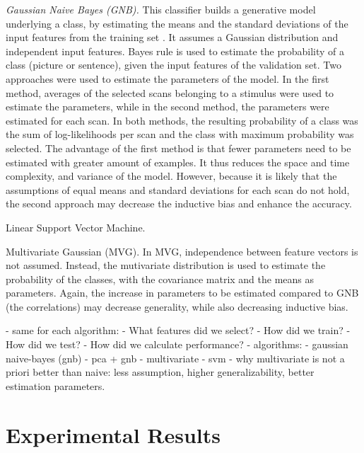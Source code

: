 \documentclass[preprint,journal,11pt]{vgtc}
\begin{document}
\emph{Gaussian Naive Bayes (GNB).} This classifier builds a generative model underlying a class, by estimating the means and the standard deviations of the input features from the training set \cite{bk:2004aplay}. It assumes a Gaussian distribution and independent input features. Bayes rule is used to estimate the probability of a class (picture or sentence), given the input features of the validation set. Two approaches were used to estimate the parameters of the model. In the first method, averages of the selected scans belonging to a stimulus were used to estimate the parameters, while in the second method, the parameters were estimated for each scan. In both methods, the resulting probability of a class was the sum of log-likelihoods per scan and the class with maximum probability was selected. The advantage of the first method is that fewer parameters need to be estimated with greater amount of examples. It thus reduces the space and time complexity, and variance of the model. However, because it is likely that the assumptions of equal means and standard deviations for each scan do not hold, the second approach may decrease the inductive bias and enhance the accuracy.  

Linear Support Vector Machine.

Multivariate Gaussian (MVG). In MVG, independence between feature vectors is not assumed. Instead, the mutivariate distribution is used to estimate the probability of the classes, with the covariance matrix and the means as parameters. Again, the increase in parameters to be estimated compared to GNB (the correlations) may decrease generality, while also decreasing inductive bias.


- same for each algorithm:
    - What features did we select?
    - How did we train?
    - How did we test?
        - How did we calculate performance?
- algorithms:
    - gaussian naive-bayes (gnb)
        - pca + gnb
    - multivariate
    - svm
    - why multivariate is not a priori better than naive: less assumption, higher generalizability, better estimation parameters. 



\section{Experimental Results}
\label{sec:results}
\end{document}
